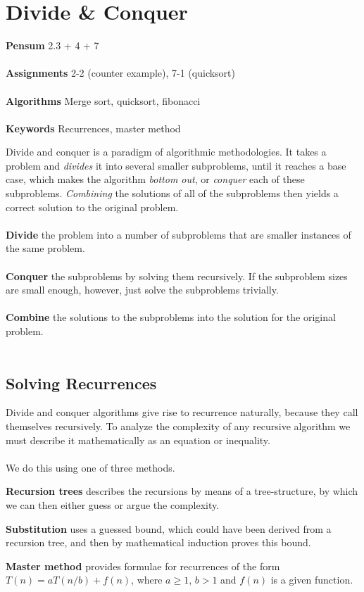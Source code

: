
\chapter{Divide \& Conquer}
\label{ch:divideandconquer}

\textbf{Pensum} 2.3 + 4 + 7 \cite{clrs} \\\\
\textbf{Assignments} 2-2 (counter example), 7-1 (quicksort)\\\\
\textbf{Algorithms} Merge sort, quicksort, fibonacci\\\\
\textbf{Keywords} Recurrences, master method
\vspace{1in}

\noindent Divide and conquer is a paradigm of algorithmic methodologies. It
takes a problem and \textit{divides} it into several smaller subproblems,
until it reaches a base case, which makes the algorithm \textit{bottom out},
or \textit{conquer} each of these subproblems. \textit{Combining} the
solutions of all of the subproblems then yields a correct solution to the
original problem.
\\\\
\noindent \textbf{Divide} the problem into a number of subproblems that are
smaller instances of the same problem.
\\\\
\noindent \textbf{Conquer} the subproblems by solving them recursively. If the
subproblem sizes are small enough, however, just solve the subproblems
trivially.
\\\\
\noindent \textbf{Combine} the solutions to the subproblems into the solution
for the original problem.
\\\\

\section{Solving Recurrences}
Divide and conquer algorithms give rise to recurrence naturally, because they
call themselves recursively. To analyze the complexity of any recursive
algorithm we must describe it mathematically as an equation or inequality.
\\\\
We do this using one of three methods.
\begin{description}
	\item \textbf{Recursion trees} describes the recursions by means of a
tree-structure, by which we can then either guess or argue the complexity.
	\item \textbf{Substitution} uses a guessed bound, which could have been
derived from a recursion tree, and then by mathematical induction proves this
bound.
	\item \textbf{Master method} provides formulae for recurrences of the form
$T(n) = a T(n/b) + f(n)$, where $a \geq 1$, $b > 1$ and $f(n)$ is a given
function.
\end{description}

